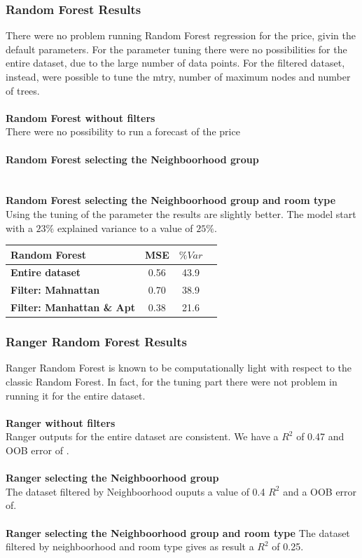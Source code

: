 \documentclass{FR16}
\begin{document}
\subsubsection{Random Forest Results}
There were no problem running Random Forest regression for the price, givin the default parameters. For the parameter tuning there were no possibilities for the entire dataset, due to the large number of data points. For the filtered dataset, instead, were possible to tune the mtry, number of maximum nodes and number of trees.
\\\\ \textbf{Random Forest  without filters}\\
There were no possibility to run a forecast of the price
\\\\
\textbf{Random Forest selecting the Neighboorhood group}\\
\\\\ 
\textbf{Random Forest selecting the Neighboorhood group and room type}
Using the tuning of the parameter the results are slightly better. The model start with a $23\%$ explained variance to a value of $25\%$.


\begin{center}
\begin{tabular}{l c c c }
\arrayrulecolor{Azzurro}
\hline
{\bfseries Random Forest
} & MSE & $\% Var $  \\
\hline
{\bfseries Entire dataset} &  0.56 & 43.9   \\
{\bfseries Filter: Mahnattan}& 0.70 & 38.9   \\
{\bfseries Filter: Manhattan \& Apt}&  0.38 & 21.6   \\
\hline
\end{tabular}
\end{center}
\subsubsection{Ranger Random Forest Results}
Ranger Random Forest is known to be computationally light with respect to the classic Random Forest. In fact, for the tuning part there were not problem in running it for the entire dataset. 
\\\\ \textbf{Ranger without filters}\\
Ranger outputs for the entire dataset are consistent. We have a $R^2$ of 0.47 and OOB error of .
\\\\
\textbf{Ranger selecting the Neighboorhood group}\\
The dataset filtered by Neighboorhood ouputs a value of 0.4 $R^2$ and a OOB error of.
\\\\ 
\textbf{Ranger selecting the Neighboorhood group and room type}
The dataset filtered by neighboorhood and room type gives as result a $R^2$ of 0.25.
\\\\
\end{document}
